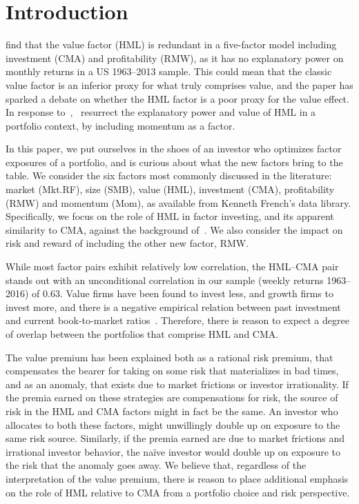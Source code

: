 \section{Introduction}
\textcite{FF2015} find that the value factor (HML) is redundant in a five-factor model including investment (CMA) and profitability (RMW), as it has no explanatory power on monthly returns in a US 1963--2013 sample. This could mean that the classic value factor is an inferior proxy for what truly comprises value, and the paper has sparked a debate on whether the HML factor is a poor proxy for the value effect. In response to~\textcite{FF2015},~\textcite{Asness2015} resurrect the explanatory power and value of HML in a portfolio context, by including momentum as a factor.

In this paper, we put ourselves in the shoes of an investor who optimizes factor exposures of a portfolio, and is curious about what the new factors bring to the table. We consider the six factors most commonly discussed in the literature: market (Mkt.RF), size (SMB), value (HML), investment (CMA), profitability (RMW) and momentum (Mom), as available from Kenneth French's data library. Specifically, we focus on the role of HML in factor investing, and its apparent similarity to CMA, against the background of~\textcite{FF2015,Asness2015}. We also consider the impact on risk and reward of including the other new factor, RMW.

While most factor pairs exhibit relatively low correlation, the HML--CMA pair stands out with an unconditional correlation in our sample (weekly returns 1963--2016) of 0.63. Value firms have been found to invest less, and growth firms to invest more, and there is a negative empirical relation between past investment and current book-to-market ratios~\autocite{Zhang2005,AndersonGarciaFeijoo2006}. Therefore, there is reason to expect a degree of overlap between the portfolios that comprise HML and CMA.

The value premium has been explained both as a rational risk premium, that compensates the bearer for taking on some risk that materializes in bad times, and as an anomaly, that exists due to market frictions or investor irrationality. If the premia earned on these strategies are compensations for risk, the source of risk in the HML and CMA factors might in fact be the same. An investor who allocates to both these factors, might unwillingly double up on exposure to the same risk source. Similarly, if the premia earned are due to market frictions and irrational investor behavior, the naïve investor would double up on exposure to the risk that the anomaly goes away. We believe that, regardless of the interpretation of the value premium, there is reason to place additional emphasis on the role of HML relative to CMA from a portfolio choice and risk perspective.

